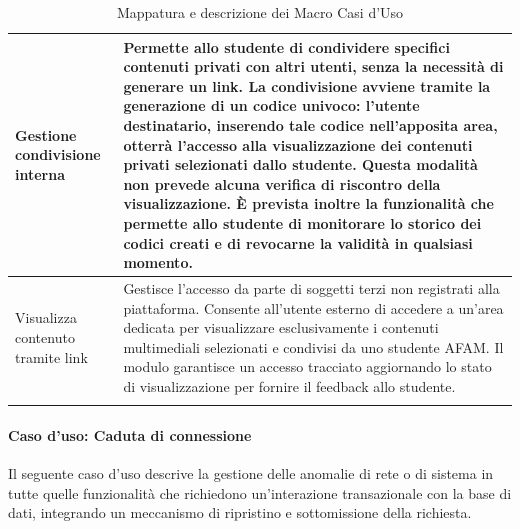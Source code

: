 \documentclass[12pt,a4paper]{article}
\newcommand{\spaziocontenuto}{\mbox{}\par\vspace{1.2cm}}
\begin{document}
\begin{longtable}{|
>{\columncolor{unipablue}\color{white}\bfseries\raggedright\arraybackslash}p{4.1cm}|
>{\raggedright\arraybackslash}p{10.4cm}|}
Gestione condivisione interna & Permette allo studente di condividere specifici contenuti privati con altri utenti, senza la necessità di generare un link. La condivisione avviene tramite la generazione di un codice univoco: l'utente destinatario, inserendo tale codice nell'apposita area, otterrà l'accesso alla visualizzazione dei contenuti privati selezionati dallo studente. Questa modalità non prevede alcuna verifica di riscontro della visualizzazione. È prevista inoltre la funzionalità che permette allo studente di monitorare lo storico dei codici creati e di revocarne la validità in qualsiasi momento. \\ \hline
Visualizza contenuto tramite link & Gestisce l'accesso da parte di soggetti terzi non registrati alla piattaforma. Consente all'utente esterno di accedere a un'area dedicata per visualizzare esclusivamente i contenuti multimediali selezionati e condivisi da uno studente AFAM. Il modulo garantisce un accesso tracciato aggiornando lo stato di visualizzazione per fornire il feedback allo studente. \\ \hline
\caption{Mappatura e descrizione dei Macro Casi d'Uso}
\label{tab:macro_casi_uso}\\
\end{longtable}
\normalsize

\spaziocontenuto
\newpage
\paragraph{Caso d'uso: Caduta di connessione}
Il seguente caso d'uso descrive la gestione delle anomalie di rete o di sistema in tutte quelle funzionalità che richiedono un'interazione transazionale con la base di dati, integrando un meccanismo di ripristino e sottomissione della richiesta.
\end{document}
